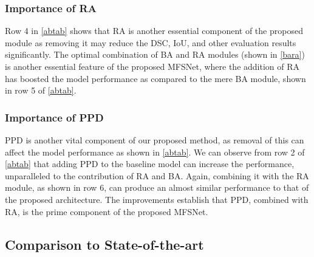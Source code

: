 \documentclass[review]{elsarticle}
\begin{document}
\subsubsection{Importance of RA}
Row 4 in \autoref{abtab} shows that RA is another essential component of the proposed module as removing it may reduce the DSC, IoU, and other evaluation results significantly. The optimal combination of BA and RA modules (shown in \autoref{bara}) is another essential feature of the proposed MFSNet, where the addition of RA has boosted the model performance as compared to the mere BA module, shown in row 5 of \autoref{abtab}.


\subsubsection{Importance of PPD}
PPD is another vital component of our proposed method, as removal of this can affect the model performance as shown in \autoref{abtab}. We can observe from row 2 of \autoref{abtab} that adding PPD to the baseline model can increase the performance, unparalleled to the contribution of RA and BA. Again, combining it with the RA module, as shown in row 6, can produce an almost similar performance to that of the proposed architecture. The improvements establish that PPD, combined with RA, is the prime component of the proposed MFSNet.    


\subsection{Comparison to State-of-the-art}\label{SOTA}
\end{document}
